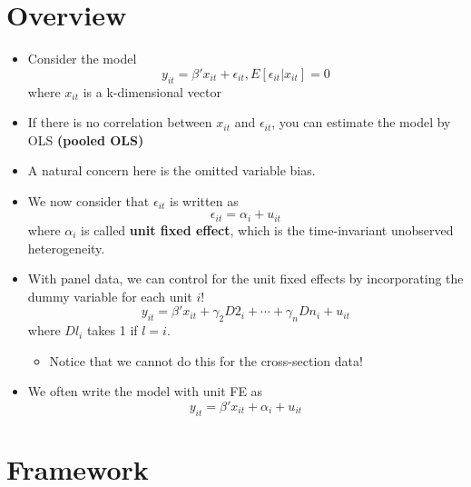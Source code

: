 \documentclass[]{book}
\providecommand{\tightlist}{%
  \setlength{\itemsep}{0pt}\setlength{\parskip}{0pt}}
\begin{document}
\section{Overview}\label{overview}

\begin{itemize}
\tightlist
\item
  Consider the model \[
  y_{it} = \beta' x_{it} + \epsilon_{it}, E[\epsilon_{it} | x_{it} ] = 0
  \] where \(x_{it}\) is a k-dimensional vector
\item
  If there is no correlation between \(x_{it}\) and \(\epsilon_{it}\),
  you can estimate the model by OLS \textbf{(pooled OLS)}
\item
  A natural concern here is the omitted variable bias.
\item
  We now consider that \(\epsilon_{it}\) is written as \[
  \epsilon_{it} = \alpha_i + u_{it}
  \] where \(\alpha_i\) is called \textbf{unit fixed effect}, which is
  the time-invariant unobserved heterogeneity.
\item
  With panel data, we can control for the unit fixed effects by
  incorporating the dummy variable for each unit \(i\)! \[
  y_{it} = \beta' x_{it} + \gamma_2 D2_i + \cdots + \gamma_n Dn_i + u_{it}
  \] where \(Dl_i\) takes 1 if \(l=i\).

  \begin{itemize}
  \tightlist
  \item
    Notice that we cannot do this for the cross-section data!
  \end{itemize}
\item
  We often write the model with unit FE as \[
  y_{it} = \beta' x_{it} + \alpha_i + u_{it}
  \]
\end{itemize}

\section{Framework}\label{framework}
\end{document}
